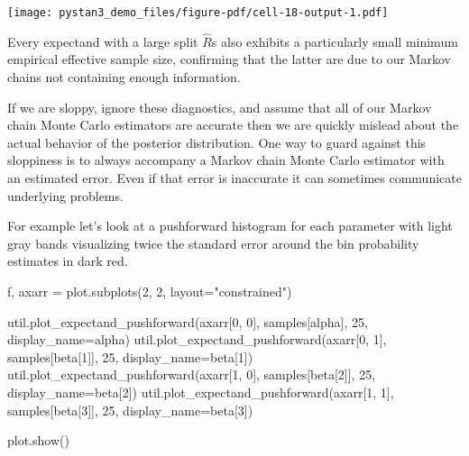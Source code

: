 \documentclass[
  letterpaper,
  DIV=11,
  numbers=noendperiod]{scrartcl}
\newenvironment{Shaded}{\begin{snugshade}}{\end{snugshade}}
\newcommand{\DecValTok}[1]{\textcolor[rgb]{0.68,0.00,0.00}{#1}}
\newcommand{\NormalTok}[1]{\textcolor[rgb]{0.00,0.23,0.31}{#1}}
\newcommand{\OperatorTok}[1]{\textcolor[rgb]{0.37,0.37,0.37}{#1}}
\newcommand{\StringTok}[1]{\textcolor[rgb]{0.13,0.47,0.30}{#1}}
\begin{document}
\texttt{[image: pystan3\_demo\_files/figure-pdf/cell-18-output-1.pdf]}

Every expectand with a large split \(\hat{R}\)s also exhibits a
particularly small minimum empirical effective sample size, confirming
that the latter are due to our Markov chains not containing enough
information.

If we are sloppy, ignore these diagnostics, and assume that all of our
Markov chain Monte Carlo estimators are accurate then we are quickly
mislead about the actual behavior of the posterior distribution. One way
to guard against this sloppiness is to always accompany a Markov chain
Monte Carlo estimator with an estimated error. Even if that error is
inaccurate it can sometimes communicate underlying problems.

For example let's look at a pushforward histogram for each parameter
with light gray bands visualizing twice the standard error around the
bin probability estimates in dark red.

\begin{Shaded}
\begin{Highlighting}[]
\NormalTok{f, axarr }\OperatorTok{=}\NormalTok{ plot.subplots(}\DecValTok{2}\NormalTok{, }\DecValTok{2}\NormalTok{, layout}\OperatorTok{=}\StringTok{"constrained"}\NormalTok{)}

\NormalTok{util.plot\_expectand\_pushforward(axarr[}\DecValTok{0}\NormalTok{, }\DecValTok{0}\NormalTok{], samples[}\StringTok{\textquotesingle{}alpha\textquotesingle{}}\NormalTok{], }
                                \DecValTok{25}\NormalTok{, display\_name}\OperatorTok{=}\StringTok{\textquotesingle{}alpha\textquotesingle{}}\NormalTok{)}
\NormalTok{util.plot\_expectand\_pushforward(axarr[}\DecValTok{0}\NormalTok{, }\DecValTok{1}\NormalTok{], samples[}\StringTok{\textquotesingle{}beta[1]\textquotesingle{}}\NormalTok{], }
                                \DecValTok{25}\NormalTok{, display\_name}\OperatorTok{=}\StringTok{\textquotesingle{}beta[1]\textquotesingle{}}\NormalTok{)}
\NormalTok{util.plot\_expectand\_pushforward(axarr[}\DecValTok{1}\NormalTok{, }\DecValTok{0}\NormalTok{], samples[}\StringTok{\textquotesingle{}beta[2]\textquotesingle{}}\NormalTok{], }
                                \DecValTok{25}\NormalTok{, display\_name}\OperatorTok{=}\StringTok{\textquotesingle{}beta[2]\textquotesingle{}}\NormalTok{)}
\NormalTok{util.plot\_expectand\_pushforward(axarr[}\DecValTok{1}\NormalTok{, }\DecValTok{1}\NormalTok{], samples[}\StringTok{\textquotesingle{}beta[3]\textquotesingle{}}\NormalTok{], }
                                \DecValTok{25}\NormalTok{, display\_name}\OperatorTok{=}\StringTok{\textquotesingle{}beta[3]\textquotesingle{}}\NormalTok{)}

\NormalTok{plot.show()}
\end{Highlighting}
\end{Shaded}
\end{document}
